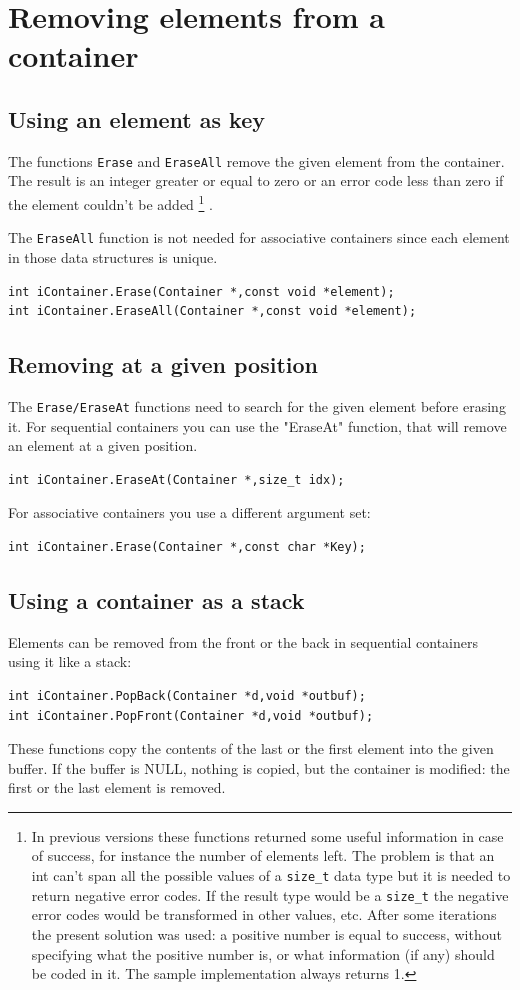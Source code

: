 \documentclass[12pt,a4paper]{memoir} %
\begin{document}
\section{Removing elements from a container}
\subsection{Using an element as key}
The functions \texttt{Erase} and \texttt{EraseAll} remove the given element from the container. 
The result is an integer greater or equal to zero or an error code less than zero if the element couldn't be added
\footnote{In previous versions these functions returned some useful information in case of success, for instance the number of elements left. The problem is that an int can't span all the possible values of a \texttt{size\_t} data type but it is needed to return negative
error codes. If the result type would be a \texttt{size\_t} the negative error codes would be transformed in other values, etc. After some iterations 
the present solution was used: a positive number is equal to success, without specifying what the positive number is, or what information (if any) 
should be coded in it. The sample implementation always returns 1.} 
.

The \texttt{EraseAll} function is not needed for associative containers since each element in those data structures is unique.
\begin{verbatim}
int iContainer.Erase(Container *,const void *element);
int iContainer.EraseAll(Container *,const void *element);
\end{verbatim}
\subsection{Removing at a given position}
\noindent The \texttt{Erase/EraseAt} functions need to search for the given element before erasing it. For sequential containers you can use the "EraseAt" function, that will remove an element at a given position.
\begin{verbatim}
int iContainer.EraseAt(Container *,size_t idx);
\end{verbatim}
\noindent
For associative containers you use a different argument set:
\begin{verbatim}
int iContainer.Erase(Container *,const char *Key);
\end{verbatim}
\subsection{Using a container as a stack}
Elements can be removed from the front or the back in sequential containers using it like a stack:
\begin{verbatim}
int iContainer.PopBack(Container *d,void *outbuf);
int iContainer.PopFront(Container *d,void *outbuf);
\end{verbatim}
These functions copy the contents of the last or the first element into the given buffer. If the buffer is NULL, nothing is copied, but the
container is modified: the first or the last element is removed.
\end{document}
